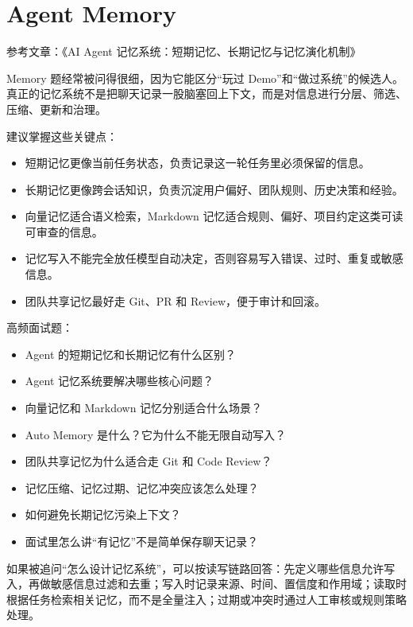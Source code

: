 \documentclass[9pt,a4paper,twocolumn]{ctexart}
\begin{document}
\section*{Agent Memory}


参考文章：《AI Agent 记忆系统：短期记忆、长期记忆与记忆演化机制》



Memory 题经常被问得很细，因为它能区分“玩过 Demo”和“做过系统”的候选人。真正的记忆系统不是把聊天记录一股脑塞回上下文，而是对信息进行分层、筛选、压缩、更新和治理。



建议掌握这些关键点：


\begin{itemize}[itemsep=1pt, topsep=2pt]
  \item 短期记忆更像当前任务状态，负责记录这一轮任务里必须保留的信息。
  \item 长期记忆更像跨会话知识，负责沉淀用户偏好、团队规则、历史决策和经验。
  \item 向量记忆适合语义检索，Markdown 记忆适合规则、偏好、项目约定这类可读可审查的信息。
  \item 记忆写入不能完全放任模型自动决定，否则容易写入错误、过时、重复或敏感信息。
  \item 团队共享记忆最好走 Git、PR 和 Review，便于审计和回滚。
\end{itemize}


高频面试题：


\begin{itemize}[itemsep=1pt, topsep=2pt]
  \item Agent 的短期记忆和长期记忆有什么区别？
  \item Agent 记忆系统要解决哪些核心问题？
  \item 向量记忆和 Markdown 记忆分别适合什么场景？
  \item Auto Memory 是什么？它为什么不能无限自动写入？
  \item 团队共享记忆为什么适合走 Git 和 Code Review？
  \item 记忆压缩、记忆过期、记忆冲突应该怎么处理？
  \item 如何避免长期记忆污染上下文？
  \item 面试里怎么讲“有记忆”不是简单保存聊天记录？
\end{itemize}


如果被追问“怎么设计记忆系统”，可以按读写链路回答：先定义哪些信息允许写入，再做敏感信息过滤和去重；写入时记录来源、时间、置信度和作用域；读取时根据任务检索相关记忆，而不是全量注入；过期或冲突时通过人工审核或规则策略处理。
\end{document}
